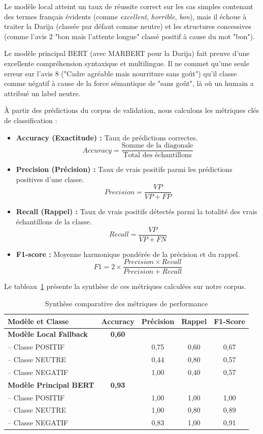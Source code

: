 Le modèle local atteint un taux de réussite correct sur les cas simples contenant des termes français évidents (comme \textit{excellent}, \textit{horrible}, \textit{bon}), mais il échoue à traiter la Darija (classée par défaut comme neutre) et les structures concessives (comme l'avis 2 "bon mais l'attente longue" classé positif à cause du mot "bon").

Le modèle principal BERT (avec MARBERT pour la Darija) fait preuve d'une excellente compréhension syntaxique et multilingue. Il ne commet qu'une seule erreur sur l'avis 8 ("Cadre agréable mais nourriture sans goût") qu'il classe comme négatif à cause de la force sémantique de "sans goût", là où un humain a attribué un label neutre.

À partir des prédictions du corpus de validation, nous calculons les métriques clés de classification :
\begin{itemize}
    \item \textbf{Accuracy (Exactitude) :} Taux de prédictions correctes.
    \[Accuracy = \frac{\text{Somme de la diagonale}}{\text{Total des échantillons}}\]
    \item \textbf{Precision (Précision) :} Taux de vrais positifs parmi les prédictions positives d'une classe.
    \[Precision = \frac{VP}{VP + FP}\]
    \item \textbf{Recall (Rappel) :} Taux de vrais positifs détectés parmi la totalité des vrais échantillons de la classe.
    \[Recall = \frac{VP}{VP + FN}\]
    \item \textbf{F1-score :} Moyenne harmonique pondérée de la précision et du rappel.
    \[F1 = 2 \times \frac{Precision \times Recall}{Precision + Recall}\]
\end{itemize}

Le tableau~\ref{tab:evaluation-metrics} présente la synthèse de ces métriques calculées sur notre corpus.

\setcounter{table}{6}
\begin{table}[H]
\centering
\caption{Synthèse comparative des métriques de performance}
\label{tab:evaluation-metrics}
\begin{tabularx}{\textwidth}{X c c c c}
\toprule
\textbf{Modèle et Classe} & \textbf{Accuracy} & \textbf{Précision} & \textbf{Rappel} & \textbf{F1-Score} \\
\midrule
\textbf{Modèle Local Fallback} & \textbf{0,60} & & & \\
-- Classe POSITIF & & 0,75 & 0,60 & 0,67 \\
-- Classe NEUTRE & & 0,44 & 0,80 & 0,57 \\
-- Classe NEGATIF & & 1,00 & 0,40 & 0,57 \\
\midrule
\textbf{Modèle Principal BERT} & \textbf{0,93} & & & \\
-- Classe POSITIF & & 1,00 & 1,00 & 1,00 \\
-- Classe NEUTRE & & 1,00 & 0,80 & 0,89 \\
-- Classe NEGATIF & & 0,83 & 1,00 & 0,91 \\
\bottomrule
\end{tabularx}
\end{table}

